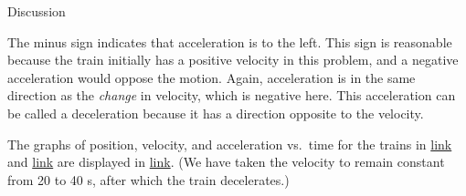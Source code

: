 \documentclass[
]{book}
\newenvironment{tinysection}{}{}
\begin{document}
\begin{tinysection}

{Discussion}

\end{tinysection}

The minus sign indicates that acceleration is to the left. This sign is
reasonable because the train initially has a positive velocity in this
problem, and a negative acceleration would oppose the motion. Again,
acceleration is in the same direction as the \emph{change} in velocity, which
is negative here. This acceleration can be called a deceleration because
it has a direction opposite to the velocity.

The graphs of position, velocity, and acceleration vs.~time for the
trains in \protect\hyperlink{fs-id1372721}{link} and
\protect\hyperlink{fs-id3600466}{link} are displayed in
\protect\hyperlink{import-auto-id2596938}{link}. (We have taken
the velocity to remain constant from 20 to 40 s, after which the train
decelerates.)
\end{document}
